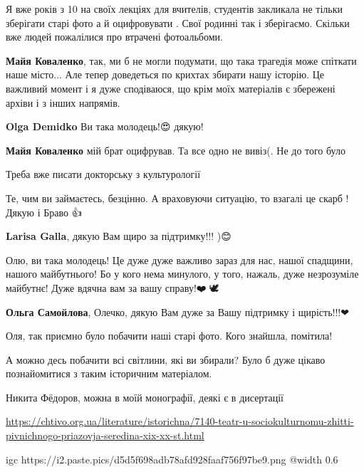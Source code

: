 Я вже років з 10 на своїх лекціях для вчителів, студентів закликала не тільки
зберігати старі фото а й оцифровувати . Свої родинні так і зберігаємо. Скільки
вже людей пожалілися про втрачені фотоальбоми.

\begin{itemize} %
\textbf{Майя Коваленко}, так, ми б не могли подумати, що така трагедія може спіткати наше місто... Але тепер доведеться по крихтах збирати нашу історію. Це важливий момент і я дуже сподіваюся, що крім моїх матеріалів є збережені архіви і з інших напрямів.

\textbf{Olga Demidko} Ви така молодець!😍 дякую!

\textbf{Майя Коваленко} мій брат оцифрував. Та все одно не вивіз(. Не до того було
\end{itemize} %


Треба вже писати докторську з культурології


Те, чим ви займаєтесь, безцінно. А враховуючи ситуацію, то взагалі це скарб ! Дякую і Браво 👍👏👏👏

\begin{itemize} %
\textbf{Larisa Galla}, дякую Вам щиро за підтримку!!! )😊
\end{itemize} %


Олю, ви така молодець! Це дуже дуже важливо зараз для нас, нашої спадщини,
нашого майбутнього! Бо у кого нема минулого, у того, нажаль, дуже незрозуміле
майбутнє! Дуже вдячна вам за вашу справу!❤️🙏🕊️

\begin{itemize} %
\textbf{Ольга Самойлова}, Олечко, дякую Вам дуже за Вашу підтримку і щирість!!!❤🙏😊
\end{itemize} %


Оля, так приємно було побачити наші старі фото. Кого знайшла, помітила!


А можно десь побачити всі світлини, які ви збирали? Було б дуже цікаво
познайомитися з таким історичним матеріалом.

\begin{itemize} %

Никита Фёдоров, можна в моїй монографії, деякі є в дисертації


\url{https://chtivo.org.ua/literature/istorichna/7140-teatr-u-sociokulturnomu-zhitti-pivnichnogo-priazovja-seredina-xix-xx-st.html}

\ifcmt
  igc https://i2.paste.pics/d5d5f698adb78afd928faaf756f97be9.png
  @width 0.6
\fi

\end{itemize} %
